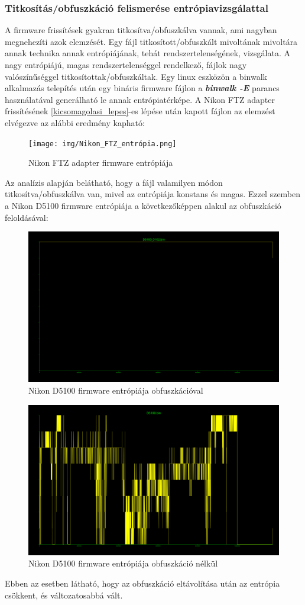 \subsubsection{Titkosítás/obfuszkáció felismerése entrópiavizsgálattal}
A firmware frissítések gyakran titkosítva/obfuszkálva vannak, ami nagyban megnehezíti azok elemzését.
Egy fájl titkosított/obfuszkált mivoltának mivoltára annak technika annak entrópiájának, tehát rendszertelenségének, vizsgálata.
A nagy entrópiájú, magas rendszertelenséggel rendelkező, fájlok nagy valószínűséggel titkosítottak/obfuszkáltak. \cite{miessler2015securing}
Egy linux eszközön a binwalk alkalmazás telepítés után egy bináris firmware fájlon a \textbf{\textit{binwalk -E\space [FÁJLNÉV]}} parancs használatával generálható le annak entrópiatérképe.
A Nikon FTZ adapter frissítésének \ref{kicsomagolasi_lepes}-es lépése után kapott fájlon az elemzést elvégezve az alábbi eredmény kapható:
\begin{figure}[H]
	\centering
	\texttt{[image: img/Nikon\_FTZ\_entrópia.png]}
	\caption{Nikon FTZ adapter firmware entrópiája}
	\label{fig:Nikon_FTZ_entrópia}
\end{figure}
Az analízis alapján belátható, hogy a fájl valamilyen módon titkosítva/obfuszkálva van, mivel az entrópiája konstans és magas.
Ezzel szemben a Nikon D5100 firmware entrópiája a következőképpen alakul az obfuszkáció feloldásával:
\begin{figure}[H]
	\centering
	\includegraphics[width=0.7\linewidth]{img/D5100_before.png}
	\caption{Nikon D5100 firmware entrópiája obfuszkációval}
	\label{fig:Nikon_5100_elotte_entropia}
\end{figure}\begin{figure}[H]
	\centering
	\includegraphics[width=0.7\linewidth]{img/D5100_after.png}
	\caption{Nikon D5100 firmware entrópiája obfuszkáció nélkül}
	\label{fig:Nikon_5100_utana_entropia}
\end{figure}
Ebben az esetben látható, hogy az obfuszkáció eltávolítása után az entrópia csökkent, és változatosabbá vált.

